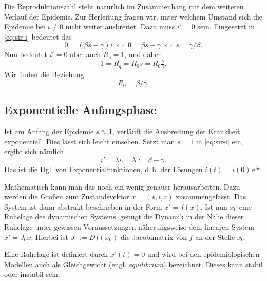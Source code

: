 \documentclass[a4paper,10pt,fleqn,twocolumn,twoside,dvipdfmx]{scrartcl}
\numberwithin{equation}{section}
\newcommand{\ee}{\mathrm e}
\begin{document}
Die Reproduktionszahl steht natürlich im Zusammenhang mit dem weiteren
Verlauf der Epidemie. Zur Herleitung fragen wir, unter welchem Umstand
sich die Epidemie bei $i\ne 0$ nicht weiter ausbreitet. Dazu muss
$i'=0$ sein. Eingesetzt in \eqref{eq:sir-i} bedeutet das%
\begin{equation}
0 = (\beta s - \gamma) i \;\Leftrightarrow\; 0 = \beta s - \gamma
\;\Leftrightarrow\; s = \gamma/\beta.
\end{equation}
Nun bedeutet $i'=0$ aber auch $R_q=1$, und daher %
\begin{equation}
1 = R_q = R_0 s = R_0 \tfrac{\gamma}{\beta}.
\end{equation}
Wir finden die Beziehung
\begin{equation}
R_0 = \beta/\gamma.
\end{equation}

\subsection{Exponentielle Anfangsphase}

Ist am Anfang der Epidemie $s\approx 1$, verläuft die Ausbreitung
der Krankheit exponentiell. Dies lässt sich leicht einsehen. Setzt
man $s=1$ in \eqref{eq:sir-i} ein, ergibt sich nämlich%
\begin{equation}\label{eq:i-ode-exp}
i' = \lambda i,\quad \lambda := \beta-\gamma.
\end{equation}
Das ist die Dgl. von Exponentialfunktionen, d.\,h. der Lösungen
$i(t) = i(0)\,\ee^{\lambda t}$.

Mathematisch kann man das noch ein wenig genauer herausarbeiten.
Dazu werden die Größen zum Zustandsvektor $x=(s,i,r)$ zusammengefasst.
Das System ist dann abstrakt beschrieben in der Form $x'=f(x)$. Ist
nun $x_0$ eine Ruhelage des dynamischen Systems, genügt die Dynamik
in der Nähe dieser Ruhelage unter gewissen Voraussetzungen
näherungsweise dem linearen System $x' = J_0 x$. Hierbei ist
$J_0:=Df(x_0)$ die Jacobimatrix von $f$ an der Stelle $x_0$.

Eine Ruhelage ist definiert durch $x'(t)=0$ und wird bei den
epidemiologischen Modellen auch als Gleichgewicht (engl.
\emph{equilibrium}) bezeichnet. Dieses kann stabil oder instabil sein.
\end{document}
